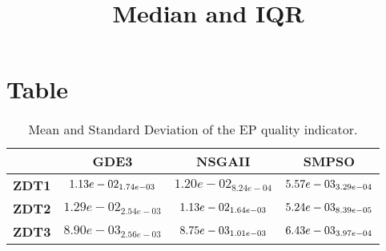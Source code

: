 \documentclass{article}
\title{Median and IQR}
\author{}
\begin{document}
\maketitle
\section{Table}
\begin{table}[!htp]
  \caption{Mean and Standard Deviation of the EP quality indicator.}
  \label{table:EP}
  \centering
  \begin{scriptsize}
  \begin{tabular}{c|ccc}
      & \textbf{GDE3} & \textbf{NSGAII} & \textbf{SMPSO} \\\hline
      \textbf{ZDT1} & $\cellcolor{gray25} 1.13e-02_{1.74e-03} $ & $ 1.20e-02_{8.24e-04} $ & $ \cellcolor{gray95} 5.57e-03_{3.29e-04}$ \\
      \textbf{ZDT2} & $1.29e-02_{2.54e-03} $ & $ \cellcolor{gray25} 1.13e-02_{1.64e-03} $ & $ \cellcolor{gray95} 5.24e-03_{8.39e-05}$ \\
      \textbf{ZDT3} & $8.90e-03_{2.56e-03} $ & $ \cellcolor{gray25} 8.75e-03_{1.01e-03} $ & $ \cellcolor{gray95} 6.43e-03_{3.97e-04}$ \\
  \end{tabular}
  \end{scriptsize}
\end{table}
\end{document}
